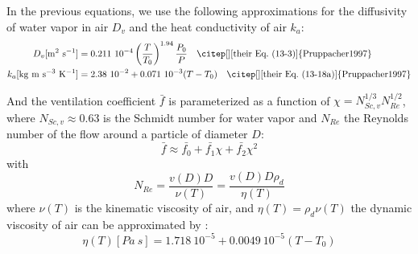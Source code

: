 In the previous equations, we use the following approximations for the diffusivity of water vapor in air $D_v$ and the heat conductivity of air $k_a$:
\begin{align}
\label{Dv}
 D_v[\mathrm{m^2~s^{-1}}] &= 0.211~10^{-4} \left(\frac{T}{T_0}\right)^{1.94}\frac{P_0}{P} \quad \text{\citep[][their Eq.\ (13-3)]{Pruppacher1997}} \\
\label{ka}
 k_a[\mathrm{kg~m~s^{-3}~K^{-1}}] &= 2.38~10^{-2} + 0.071~10^{-3} (T-T_0) \quad \text{\citep[][their Eq.\ (13-18a)]{Pruppacher1997}} \\
\end{align}

And the ventilation coefficient $\bar{f}$ is parameterized as a function of $\chi=N_{Sc,v}^{1/3}N_{Re}^{1/2}$, where $N_{Sc,v} \approx 0.63$ is the Schmidt number for water vapor and $N_{Re}$ the Reynolds number of the flow around a particle of diameter $D$:
\begin{equation}
\label{f}
 \bar{f} \approx \bar{f_0} + \bar{f_1} \chi + \bar{f_2} \chi^2
\end{equation}
with
\begin{equation}
 N_{Re} = \frac{v(D)D}{\nu(T)} = \frac{v(D)D\rho_d}{\eta(T)}
\end{equation}
where $\nu(T)$ is the kinematic viscosity of air, and $\eta(T)=\rho_d \nu(T)$ the dynamic viscosity of air can be approximated by \citep[][their Eq.\ (10-141), converting with $1~poise = 0.1$~Pa~s]{Pruppacher1997}:
\begin{equation}
 \eta(T) [Pa~s] = 1.718~10^{-5} + 0.0049~10^{-5} (T-T_0)
\end{equation}

